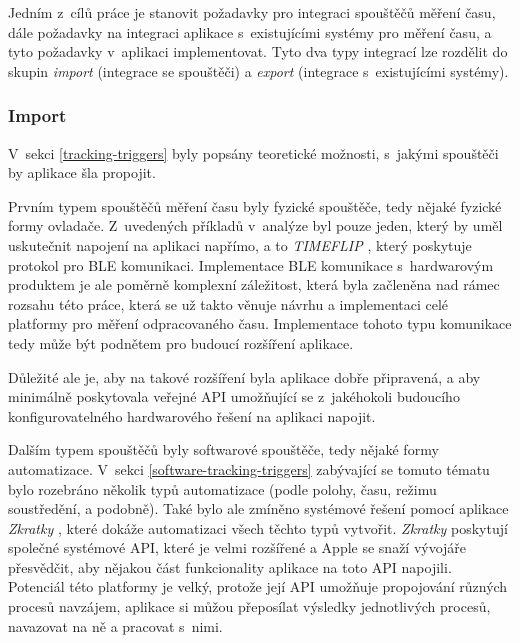 Jedním z~cílů práce je stanovit požadavky pro integraci spouštěčů měření času, dále požadavky na integraci aplikace s~existujícími systémy pro měření času, a tyto požadavky v~aplikaci implementovat. Tyto dva typy integrací lze rozdělit do skupin \emph{import} (integrace se spouštěči) a \emph{export} (integrace s~existujícími systémy).

\subsubsection{Import}\label{feature-integration-import}

V~sekci \ref{tracking-triggers} byly popsány teoretické možnosti, s~jakými spouštěči by aplikace šla propojit.

Prvním typem spouštěčů měření času byly fyzické spouštěče, tedy nějaké fyzické formy ovladače. Z~uvedených příkladů v~analýze byl pouze jeden, který by uměl uskutečnit napojení na aplikaci napřímo, a to \emph{TIMEFLIP} \cite{timeflip}, který poskytuje protokol pro BLE komunikaci. Implementace BLE komunikace s~hardwarovým produktem je ale poměrně komplexní záležitost, která byla začleněna nad rámec rozsahu této práce, která se už takto věnuje návrhu a implementaci celé platformy pro měření odpracovaného času. Implementace tohoto typu komunikace tedy může být podnětem pro budoucí rozšíření aplikace.

Důležité ale je, aby na takové rozšíření byla aplikace dobře připravená, a aby minimálně poskytovala veřejné API umožňující se z~jakéhokoli budoucího konfigurovatelného hardwarového řešení na aplikaci napojit.

Dalším typem spouštěčů byly softwarové spouštěče, tedy nějaké formy automatizace. V~sekci \ref{software-tracking-triggers} zabývající se tomuto tématu bylo rozebráno několik typů automatizace (podle polohy, času, režimu soustředění, a podobně). Také bylo ale zmíněno systémové řešení pomocí aplikace \emph{Zkratky} \cite{ios-shortcuts-app}, které dokáže automatizaci všech těchto typů vytvořit. \emph{Zkratky} poskytují společné systémové API, které je velmi rozšířené a Apple se snaží vývojáře přesvědčit, aby nějakou část funkcionality aplikace na toto API napojili. Potenciál této platformy je velký, protože její API umožňuje propojování různých procesů navzájem, aplikace si můžou přeposílat výsledky jednotlivých procesů, navazovat na ně a pracovat s~nimi. 

